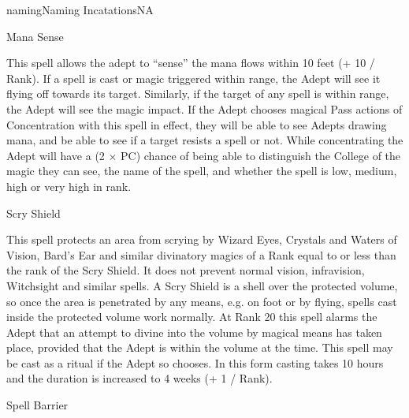 \begin{College}[2.0]{naming}{Naming Incatations}{NA}
\begin{spell}[S-7]{Mana Sense}
\begin{effects}
This spell allows the adept to “sense” the mana flows within 10 feet
(+ 10 / Rank). If a spell is cast or magic triggered within range, the
Adept will see it flying off towards its target. Similarly, if the
target of any spell is within range, the Adept will see the magic
impact.  If the Adept chooses magical Pass actions of Concentration
with this spell in effect, they will be able to see Adepts drawing
mana, and be able to see if a target resists a spell or not.  While
concentrating the Adept will have a (2 × PC) chance of being able to
distinguish the College of the magic they can see, the name of the
spell, and whether the spell is low, medium, high or very high in
rank.
\end{effects}
\end{spell}

\begin{spell}[S-8]{Scry Shield}

\begin{effects}
This spell protects an area from scrying by Wizard Eyes, Crystals and
Waters of Vision, Bard’s Ear and similar divinatory magics of a Rank
equal to or less than the rank of the Scry Shield. It does not prevent
normal vision, infravision, Witchsight and similar spells.  A Scry
Shield is a shell over the protected volume, so once the area is
penetrated by any means, e.g. on foot or by flying, spells cast inside
the protected volume work normally. At Rank 20 this spell alarms the
Adept that an attempt to divine into the volume by magical means has
taken place, provided that the Adept is within the volume at the time.
This spell may be cast as a ritual if the Adept so chooses. In this
form casting takes 10 hours and the duration is increased to 4 weeks
(+ 1 / Rank).
\end{effects}
\end{spell}

\begin{spell}[S-9]{Spell Barrier}


\end{spell}
\end{College}
